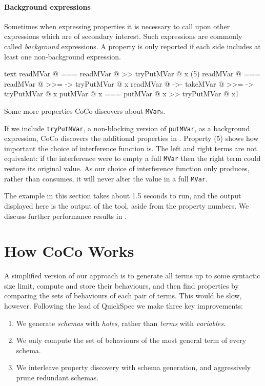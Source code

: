 \paragraph{Background expressions}
Sometimes when expressing properties it is necessary to call upon
other expressions which are of secondary interest.  Such expressions
are commonly called \emph{background} expressions.  A property is only
reported if each side includes at least one non-background expression.

\begin{listing}
\centering
\begin{cminted}{text}
      readMVar @  ===  readMVar @ >> tryPutMVar @ x
(5)   readMVar @  ===  readMVar @ >>= \x -> tryPutMVar @ x
      readMVar @  ->-  takeMVar @ >>= \x -> tryPutMVar @ x
     putMVar @ x  ===  putMVar @ x >> tryPutMVar @ x1
\end{cminted}
\caption{Some more properties CoCo discovers about \texttt{MVar}s.}\label{lst:mvar_props2}
\end{listing}

If we include \verb|tryPutMVar|, a non-blocking version of
\verb|putMVar|, as a background expression, CoCo discovers the
additional properties in .  Property (5) shows
how important the choice of interference function is.  The left and
right terms are not equivalent: if the interference were to empty a
full \verb|MVar| then the right term could restore its original value.
As our choice of interference function only produces, rather than
consumes, it will never alter the value in a full \verb|MVar|.

The example in this section takes about 1.5 seconds to run, and the
output displayed here is the output of the tool, aside from the
property numbers.  We discuss further performance results in
.

\section{How CoCo Works}
\label{sec:coco-hiw}

A simplified version of our approach is to generate all terms up to
some syntactic size limit, compute and store their behaviours, and
then find properties by comparing the sets of behaviours of each pair
of terms.  This would be slow, however.  Following the lead of
QuickSpec \parencite{claessen2010,smallbone2017} we make three key
improvements:

\begin{enumerate}
\item We generate \emph{schemas} with \emph{holes}, rather than
  \emph{terms} with \emph{variables}.
\item We only compute the set of behaviours of the most general term
  of every schema.
\item We interleave property discovery with schema generation, and
  aggressively prune redundant schemas.
\end{enumerate}

